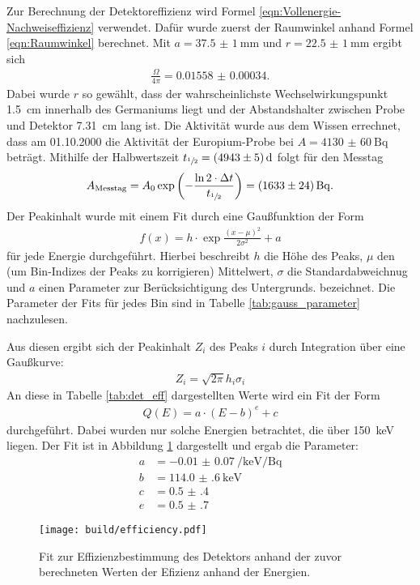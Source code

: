 Zur Berechnung der Detektoreffizienz wird Formel
\eqref{eqn:Vollenergie-Nachweiseffizienz} verwendet. Dafür wurde zuerst der
Raumwinkel anhand Formel \eqref{eqn:Raumwinkel} berechnet. Mit
$a = \SI{37.5(10)}{\milli\meter}$ und $r = \SI{22.5(10)}{\milli\meter}$ ergibt sich
\begin{align*}
  \frac{\Omega}{4\pi} = \num{0.01558(34)}.
\end{align*}
Dabei wurde $r$ so gewählt, dass der wahrscheinlichste Wechselwirkungspunkt
\SI{1.5}{\centi\meter} innerhalb des Germaniums liegt und der Abstandshalter
zwischen Probe und Detektor \SI{7.31}{\centi\meter} lang ist.
Die Aktivität wurde aus dem Wissen errechnet, dass am 01.10.2000 die Aktivität
der Europium-Probe bei $A = \SI{4130(60)}{\becquerel}$ beträgt. Mithilfe der
Halbwertszeit $t_{\sfrac{1}{2}} = \SI{4943(5)}{\day}$ folgt für den Messtag
\begin{align*}
	A_\text{Messtag} = A_0 \exp\left(-\frac{\ln{2} \cdot\Delta t}{t_{\sfrac{1}{2}}}\right)=\SI{1633(24)}{\becquerel}
	.
\end{align*}
Der Peakinhalt wurde mit einem Fit durch eine Gaußfunktion der Form
\begin{align*}
	f\left(x\right) = h\cdot \exp{\frac{(x-\mu)^2}{2\sigma^2}} + a
\end{align*}
für jede Energie durchgeführt. Hierbei beschreibt $h$ die Höhe des Peaks, $\mu$
den (um Bin-Indizes der Peaks zu korrigieren) Mittelwert, $\sigma$ die
Standardabweichnug und $a$ einen Parameter zur Berücksichtigung des Untergrunds.
bezeichnet. Die Parameter der Fits für jedes Bin sind in Tabelle
\ref{tab:gauss_parameter} nachzulesen.

\FloatBarrier

Aus diesen ergibt sich der Peakinhalt $Z_i$ des Peaks $i$ durch Integration
über eine Gaußkurve:
\begin{align*}
  Z_i = \sqrt{2\pi} h_i \sigma_i
\end{align*}
An diese in Tabelle \ref{tab:det_eff} dargestellten Werte wird ein Fit der Form
\begin{align*}
  Q(E) = a \cdot (E - b)^e + c
\end{align*}
durchgeführt. Dabei wurden nur solche Energien betrachtet, die über
\SI{150}{\kilo\electronvolt} liegen.
Der Fit ist in Abbildung \ref{plt:eff} dargestellt und ergab die Parameter:
\begin{align*}
  a &= -\SI{0.01(7)}{\per\kilo\electronvolt\per\becquerel} \\
  b &= \SI{114.0(6)}{\kilo\electronvolt} \\
  c &= \num{0.5(4)} \\
  e &= \num{0.5(7)}
\end{align*}
\begin{figure}[htb]
  \centering
  \texttt{[image: build/efficiency.pdf]}
  \caption{Fit zur Effizienzbestimmung des Detektors anhand der zuvor
  berechneten Werten der Efizienz anhand der Energien.}
  \label{plt:eff}
\end{figure}

